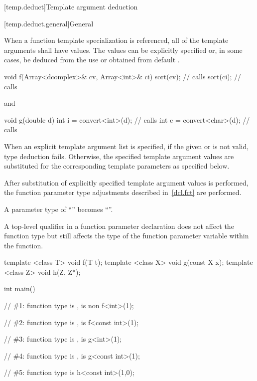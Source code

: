 [temp.deduct]{Template argument deduction}

[temp.deduct.general]{General}

\pnum
When a
function template
specialization is referenced, all of the
template arguments shall have values.
The values can be
explicitly specified or, in some cases, be deduced from the use
or obtained from default
.
\begin{example}
\begin{codeblock}
void f(Array<dcomplex>& cv, Array<int>& ci) {
  sort(cv);                     // calls 
  sort(ci);                     // calls 
}
\end{codeblock}
and
\begin{codeblock}
void g(double d) {
  int i = convert<int>(d);      // calls 
  int c = convert<char>(d);     // calls 
}
\end{codeblock}
\end{example}

\pnum
When an explicit template argument list is specified, if the
given  or
 is not valid,
type deduction fails.
Otherwise, the specified template argument values are substituted for the
corresponding template parameters as specified below.

\pnum
After substitution of explicitly specified template argument values is performed,
the function parameter type
adjustments described in~\ref{dcl.fct} are performed.
\begin{example}
A parameter type of ``'' becomes
``''.
\end{example}
\begin{note}
A top-level qualifier in a function parameter declaration does not affect
the function type but still affects the type of the function parameter
variable within the function.
\end{note}
\begin{example}
\begin{codeblock}
template <class T> void f(T t);
template <class X> void g(const X x);
template <class Z> void h(Z, Z*);

int main() {
  // \#1: function type is ,  is non 
  f<int>(1);

  // \#2: function type is ,  is 
  f<const int>(1);

  // \#3: function type is ,  is 
  g<int>(1);

  // \#4: function type is ,  is 
  g<const int>(1);

  // \#5: function type is 
  h<const int>(1,0);
}
\end{codeblock}
\end{example}

